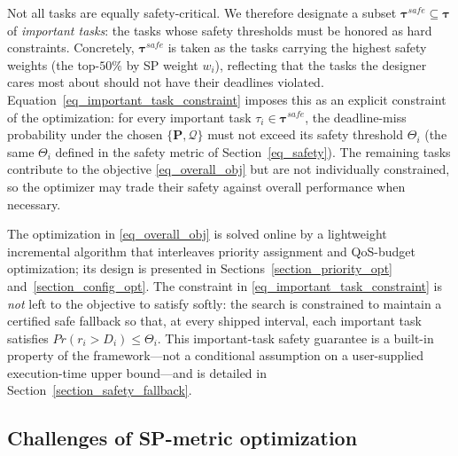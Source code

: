         Not all tasks are equally safety-critical.
        We therefore designate a subset $\boldsymbol{\tau}^{safe} \subseteq \boldsymbol{\tau}$ of \emph{important tasks}: the tasks whose safety thresholds must be honored as hard constraints.
        Concretely, $\boldsymbol{\tau}^{safe}$ is taken as the tasks carrying the highest safety weights (the top-$50\%$ by SP weight $w_i$), reflecting that the tasks the designer cares most about should not have their deadlines violated.
        Equation~\eqref{eq_important_task_constraint} imposes this as an explicit constraint of the optimization: for every important task $\tau_i \in \boldsymbol{\tau}^{safe}$, the deadline-miss probability under the chosen $\{\boldsymbol{P}, \boldsymbol{\mathcal{Q}}\}$ must not exceed its safety threshold $\Theta_i$ (the same $\Theta_i$ defined in the safety metric of Section~\ref{eq_safety}).
        The remaining tasks contribute to the objective \eqref{eq_overall_obj} but are not individually constrained, so the optimizer may trade their safety against overall performance when necessary.

        The optimization in \eqref{eq_overall_obj} is solved online by a lightweight incremental algorithm that interleaves priority assignment and QoS-budget optimization; its design is presented in Sections~\ref{section_priority_opt} and~\ref{section_config_opt}.
        The constraint in \eqref{eq_important_task_constraint} is \emph{not} left to the objective to satisfy softly: the search is constrained to maintain a certified safe fallback so that, at every shipped interval, each important task satisfies $Pr(r_i > D_i) \leq \Theta_i$.
        This important-task safety guarantee is a built-in property of the framework---not a conditional assumption on a user-supplied execution-time upper bound---and is detailed in Section~\ref{section_safety_fallback}.





	\subsection{Challenges of SP-metric optimization}

